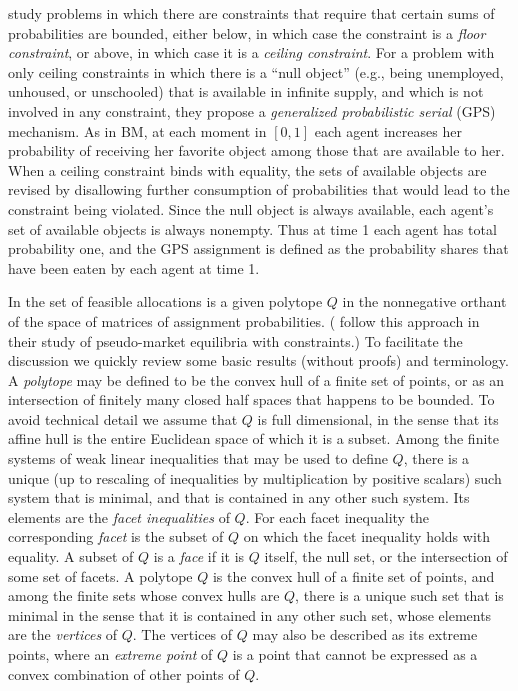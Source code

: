 \documentclass[12pt]{article}
\theoremstyle{definition}
\begin{document}
\cite{bckm13aer} study problems in which there are constraints that require that certain sums of probabilities are bounded, either below, in which case the constraint is a \emph{floor constraint}, or above, in which case it is a \emph{ceiling constraint}.  For a problem with only ceiling constraints in which  there is a ``null object'' (e.g., being unemployed, unhoused, or unschooled) that is available in infinite supply, and which is not involved in any constraint, they propose a \emph{generalized probabilistic serial} (GPS) mechanism.  As in BM, at each moment in $[0,1]$ each agent increases her probability of receiving her favorite object among those that are available to her.  When a ceiling constraint binds with equality, the sets of available objects are revised by disallowing further consumption of probabilities that would lead to the constraint being violated.  Since the null object is always available, each agent's set of available objects is always nonempty.  Thus at time 1 each agent has total probability one, and the GPS assignment is defined as the probability shares that have been eaten by each agent at time 1.

In \cite{balbuzanov22jet} the set of feasible allocations is a given polytope $Q$ in the nonnegative orthant of the space of matrices of assignment probabilities. (\cite{EcMiZh21} follow this approach in their study of pseudo-market equilibria with constraints.)   To facilitate the discussion we quickly review some basic results (without proofs) and terminology. A \emph{polytope} may be defined to be the convex hull of a finite set of points, or as an intersection of finitely many closed half spaces that happens to be bounded.  To avoid technical detail we assume that $Q$ is full dimensional, in the sense that its affine hull is the entire Euclidean space of which it is a subset. Among the finite systems of weak linear inequalities that may be used to define $Q$, there is a unique (up to rescaling of inequalities by multiplication by positive scalars) such system that is minimal, and that is contained in any other such system.  Its elements are the \emph{facet inequalities} of $Q$.  For each facet inequality the corresponding \emph{facet} is the subset of $Q$ on which the facet inequality holds with equality.  A subset of $Q$ is a \emph{face} if it is $Q$ itself, the null set, or the intersection of some set of facets.  A polytope $Q$ is the convex hull of a finite set of points, and among the finite sets whose convex hulls are $Q$, there is a unique such set that is minimal in the sense that it is contained in any other such set, whose elements are the \emph{vertices} of $Q$.  The vertices of $Q$ may also be described as its extreme points, where an \emph{extreme point} of $Q$ is a point that cannot be expressed as a convex combination of other points of $Q$.
\end{document}
